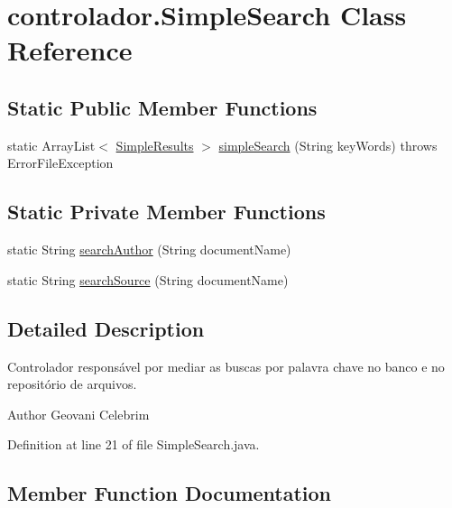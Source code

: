 \hypertarget{classcontrolador_1_1SimpleSearch}{}\section{controlador.\+Simple\+Search Class Reference}
\label{classcontrolador_1_1SimpleSearch}
\subsection*{Static Public Member Functions}
\begin{DoxyCompactItemize}
\item 
static Array\+List$<$ \hyperlink{classentidade_1_1resultados_1_1SimpleResults}{Simple\+Results} $>$ \hyperlink{classcontrolador_1_1SimpleSearch_acfd709c809ee48bf72041a0872f3a8e9}{simple\+Search} (String key\+Words)  throws Error\+File\+Exception 
\end{DoxyCompactItemize}
\subsection*{Static Private Member Functions}
\begin{DoxyCompactItemize}
\item 
static String \hyperlink{classcontrolador_1_1SimpleSearch_a2fddf8c80b57abf2d807faa6cb88a7cf}{search\+Author} (String document\+Name)
\item 
static String \hyperlink{classcontrolador_1_1SimpleSearch_aae34b43930609372fac59a868498b659}{search\+Source} (String document\+Name)
\end{DoxyCompactItemize}


\subsection{Detailed Description}
Controlador responsável por mediar as buscas por palavra chave no banco e no repositório de arquivos.

\begin{DoxyAuthor}{Author}
Geovani Celebrim 
\end{DoxyAuthor}


Definition at line 21 of file Simple\+Search.\+java.



\subsection{Member Function Documentation}
\hypertarget{classcontrolador_1_1SimpleSearch_a2fddf8c80b57abf2d807faa6cb88a7cf}{}\label{classcontrolador_1_1SimpleSearch_a2fddf8c80b57abf2d807faa6cb88a7cf} 
